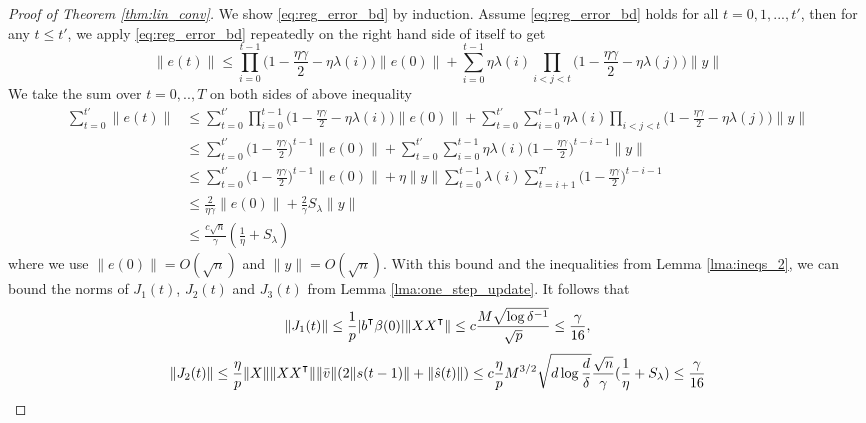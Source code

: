 \begin{proof}[Proof of Theorem \ref{thm:lin_conv}]  
We show \eqref{eq:reg_error_bd} by induction. Assume \eqref{eq:reg_error_bd} holds for all $t=0,1,...,t'$, then for any $t\leq t'$, we apply \eqref{eq:reg_error_bd} repeatedly on the right hand side of itself to get
\begin{equation*}
    \|e(t)\|\leq \prod_{i=0}^{t-1}\Big(1-\frac{\eta\gamma}{2}-\eta\lambda(i)\Big)\|e(0)\| + \sum_{i=0}^{t-1}\eta\lambda(i)\prod_{i<j<t}\Big(1-\frac{\eta\gamma}{2}-\eta\lambda(j)\Big)\|y\|
\end{equation*}
We take the sum over $t=0,..,T$ on both sides of above inequality 
\begin{equation*}
\begin{aligned}
    \sum_{t=0}^{t'}\|e(t)\|
    &\leq \sum_{t=0}^{t'}\prod_{i=0}^{t-1}\Big(1-\frac{\eta\gamma}{2}-\eta\lambda(i)\Big)\|e(0)\|  + \sum_{t=0}^{t'}\sum_{i=0}^{t-1}\eta\lambda(i)\prod_{i<j<t}\Big(1-\frac{\eta\gamma}{2}-\eta\lambda(j)\Big)\|y\| \\
    &\leq \sum_{t=0}^{t'}\Big(1-\frac{\eta\gamma}{2}\Big)^{t-1}\|e(0)\|+ \sum_{t=0}^{t'}\sum_{i=0}^{t-1}\eta\lambda(i)\Big(1-\frac{\eta\gamma}{2}\Big)^{t-i-1}\|y\| \\
    &\leq \sum_{t=0}^{t'}\Big(1-\frac{\eta\gamma}{2}\Big)^{t-1}\|e(0)\| + \eta\|y\|\sum_{t=0}^{t-1}\lambda(i)\sum_{t=i+1}^T\Big(1-\frac{\eta\gamma}{2}\Big)^{t-i-1} \\
    &\leq \frac{2}{\eta\gamma}\|e(0)\|+ \frac{2}{\gamma}S_\lambda\|y\| \\
    &\leq \frac{c\sqrt n}{\gamma}(\frac{1}{\eta}+S_\lambda)
\end{aligned}
\end{equation*} 
where we use $\|e(0)\|=O(\sqrt n)$ and $\|y\|=O(\sqrt n)$. With this bound and the inequalities from Lemma \ref{lma:ineqs_2}, we can bound the norms of $J_1(t)$, $J_2(t)$ and $J_3(t)$ from Lemma \ref{lma:one_step_update}. It follows that
\begin{equation}
\label{eq:J1_bd}
\|J_1(t)\| \leq \frac{1}{p}|b\transpose\beta(0)|\|XX\transpose\|\leq c\frac{M\sqrt{\log \delta^{-1}}}{\sqrt p}\leq \frac{\gamma}{16},
\end{equation}
\begin{equation}
\label{eq:J2_bd}
\|J_2(t)\| \leq \frac{\eta}{p}\|X\| \|XX\transpose\|\|\bar{v}\|(2\|s(t-1)\|+\|\hat{s}(t)\|)\leq c\frac{\eta}{p}M^{3/2}\sqrt{d\log\frac{d}{\delta}}\frac{\sqrt n}{\gamma}(\frac{1}{\eta}+S_\lambda)\leq \frac{\gamma}{16}
\end{equation}

\end{proof}
